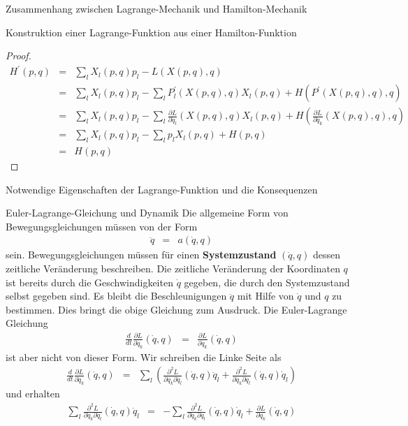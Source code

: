 \begin{chapter}{\titlestr}
\begin{appendix}
\begin{section}{Zusammenhang zwischen Lagrange-Mechanik und Hamilton-Mechanik}
\begin{subsection}{Konstruktion einer Lagrange-Funktion aus einer Hamilton-Funktion}
\begin{proof}
\begin{eqnarray*}
H^\prime(p,q) &=& \sum_lX_l(p,q)p_l-L(X(p,q),q)\\
&=&\sum_lX_l(p,q)p_l-\sum_lP^\prime_l(X(p,q),q)X_l(p,q)+H(P^\prime(X(p,q),q),q)\\
&=&\sum_lX_l(p,q)p_l-\sum_l\frac{\partial L}{\partial \dot{q}_l}(X(p,q),q)X_l(p,q)+H\left(\frac{\partial L}{\partial \dot{q}_k}(X(p,q),q),q\right)\\
&=&\sum_lX_l(p,q)p_l-\sum_lp_lX_l(p,q)+H(p,q)\\
&=&H(p,q)
\end{eqnarray*}
\end{proof}
\end{subsection}
\end{section}

\begin{section}{Notwendige Eigenschaften der Lagrange-Funktion und die Konsequenzen}
\begin{subsection}{Euler-Lagrange-Gleichung und Dynamik}
Die allgemeine Form von Bewegungsgleichungen müssen von der Form
\begin{eqnarray*}
\ddot{q} &=& a ( \dot{q}, q )
\end{eqnarray*}
sein. Bewegungsgleichungen müssen für einen \textbf{Systemzustand} $(\dot{q},q)$ dessen zeitliche Veränderung beschreiben.
Die zeitliche Veränderung der Koordinaten $q$ ist bereits durch die Geschwindigkeiten $\dot{q}$ gegeben, die durch den Systemzustand selbst gegeben sind. Es bleibt die Beschleunigungen $\ddot{q}$ mit Hilfe von $\dot{q}$ und $q$ zu bestimmen. Dies bringt die obige Gleichung zum Ausdruck. Die Euler-Lagrange Gleichung
\begin{eqnarray*}
\frac{d}{dt}\frac{\partial L}{\partial \dot{q}_k}(\dot{q},q) &=& \frac{\partial L}{\partial q_k}(\dot{q},q)
\end{eqnarray*}
ist aber nicht von dieser Form. Wir schreiben die Linke Seite als
\begin{eqnarray*}
\frac{d}{dt}\frac{\partial L}{\partial \dot{q}_k}(\dot{q},q) &=& \sum_l\left(\frac{\partial^2 L}{\partial \dot{q}_k\partial \dot{q}_l}(\dot{q},q)\ddot{q}_l+\frac{\partial^2 L}{\partial \dot{q}_k\partial q_l}(\dot{q},q)\dot{q}_l\right)
\end{eqnarray*}
und erhalten
\begin{eqnarray*}
\sum_l\frac{\partial^2 L}{\partial \dot{q}_k\partial \dot{q}_l}(\dot{q},q)\ddot{q}_l&=&-\sum_l\frac{\partial^2 L}{\partial \dot{q}_k\partial q_l}(\dot{q},q)\dot{q}_l+\frac{\partial L}{\partial q_k}(\dot{q},q)

\end{eqnarray*}
\end{subsection}
\end{section}
\end{appendix}
\end{chapter}

